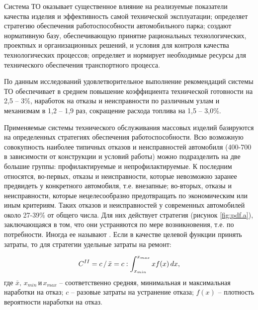 \documentclass[../nirs.tex]{subfiles}
\begin{document}
Система ТО оказывает существенное влияние на реализуемые показатели качества
изделия и эффективность самой технической эксплуатации; определяет стратегию
обеспечения работоспособности автомобильного парка; создают нормативную базу,
обеспечивающую принятие рациональных технологических, проектных и
организационных решений, и условия для контроля качества технологических
процессов; определяет и нормирует необходимые ресурсы для технического
обеспечения транспортного процесса.

По данным исследований удовлетворительное выполнение рекомендаций системы ТО
обеспечивает в среднем повышение коэффициента технической готовности на 2,5 --
3\%, наработок на отказы и неисправности по различным узлам и механизмам в 1,2
-- 1,9 раз, сокращение расхода топлива на 1,5 -- 3,0\%.

Применяемые системы технического обслуживания массовых изделий
базируются на определенных стратегиях обеспечения работоспособности. Всю
возможную совокупность наиболее типичных отказов и неисправностей автомобиля
(400-700 в зависимости от конструкции и условий работы) можно подразделить на
две большие группы: профилактируемые и непрофилактируемые. К последним
относятся, во-первых, отказы и неисправности, которые невозможно заранее
предвидеть у конкретного автомобиля, т.е. внезапные; во-вторых, отказы и
неисправности, которые нецелесообразно предотвращать по экономическим или иным
критериям. Таких отказов и неисправностей у современных автомобилей около
27-39\% от общего числа. Для них действует стратегия  (рисунок
\ref{fig:pdf.a}), заключающаяся в том, что они устраняются по мере
возникновения, т.е. по потребности. Иногда ее называют . Если в качестве целевой функции принять затраты, то для
стратегии  удельные затраты на ремонт:

\begin{equation*}
    C^{\rom{2}} =
    c\,/\,\bar{x} =
    c : \int_{x_{min}}^{x_{max}} x f(x)\,dx,
\end{equation*}
где $\bar{x},\,x_{min} \,\text{и} \,x_{max}$ -- соответственно средняя,
минимальная и максимальная наработки на отказ; $c$ -- разовые затраты на
устранение отказа; $f(x)$ -- плотность вероятности наработки на отказ.
\end{document}
